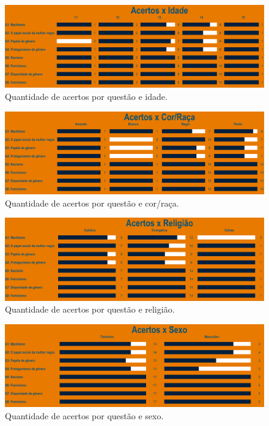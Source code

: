 \documentclass[
]{book}
\begin{document}
\begin{figure}

{\centering \includegraphics[width=0.75\linewidth,height=0.75\textheight]{images/Impactos/14} 

}

\caption{Quantidade de acertos por questão e idade.}\label{fig:impacto14}
\end{figure}

\begin{figure}

{\centering \includegraphics[width=0.75\linewidth,height=0.75\textheight]{images/Impactos/15} 

}

\caption{Quantidade de acertos por questão e cor/raça.}\label{fig:impacto15}
\end{figure}

\begin{figure}

{\centering \includegraphics[width=0.75\linewidth,height=0.75\textheight]{images/Impactos/16} 

}

\caption{Quantidade de acertos por questão e religião.}\label{fig:impacto16}
\end{figure}

\begin{figure}

{\centering \includegraphics[width=0.75\linewidth,height=0.75\textheight]{images/Impactos/17} 

}

\caption{Quantidade de acertos por questão e sexo.}\label{fig:impacto17}
\end{figure}
\end{document}
